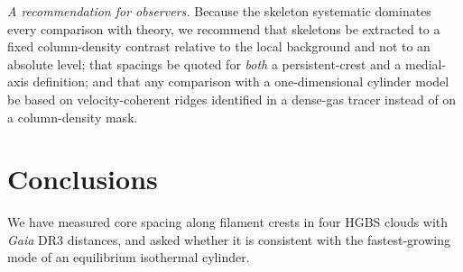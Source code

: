 \documentclass[usenatbib,twoside,twocolumn]{mnras}
\begin{document}
\smallskip\noindent\emph{A recommendation for observers.} Because the skeleton systematic dominates every comparison with theory, we recommend that skeletons be extracted to a fixed column-density contrast relative to the local background and not to an absolute level; that spacings be quoted for \emph{both} a persistent-crest and a medial-axis definition; and that any comparison with a one-dimensional cylinder model be based on velocity-coherent ridges identified in a dense-gas tracer instead of on a column-density mask.




\section{Conclusions}
\label{sec:conclusions}

We have measured core spacing along filament crests in four HGBS clouds with \textit{Gaia} DR3 distances, and asked whether it is consistent with the fastest-growing mode of an equilibrium isothermal cylinder.
\end{document}
